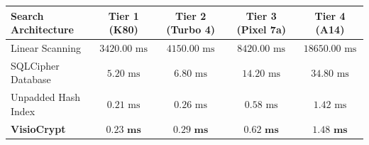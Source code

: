 \documentclass[preview,varwidth=90mm]{standalone}
\begin{document}
\begin{table}[h]
\centering
\footnotesize
\begin{tabular}{lcccc}
\toprule
\textbf{Search Architecture} & \textbf{Tier 1 (K80)} & \textbf{Tier 2 (Turbo 4)} & \textbf{Tier 3 (Pixel 7a)} & \textbf{Tier 4 (A14)} \\ \midrule
Linear Scanning & $3420.00 \text{ ms}$ & $4150.00 \text{ ms}$ & $8420.00 \text{ ms}$ & $18650.00 \text{ ms}$ \\
SQLCipher Database & $5.20 \text{ ms}$ & $6.80 \text{ ms}$ & $14.20 \text{ ms}$ & $34.80 \text{ ms}$ \\
Unpadded Hash Index & $0.21 \text{ ms}$ & $0.26 \text{ ms}$ & $0.58 \text{ ms}$ & $1.42 \text{ ms}$ \\
\textbf{VisioCrypt} & $\mathbf{0.23 \text{ ms}}$ & $\mathbf{0.29 \text{ ms}}$ & $\mathbf{0.62 \text{ ms}}$ & $\mathbf{1.48 \text{ ms}}$ \\ \bottomrule
\end{tabular}
\end{table}
\end{document}
